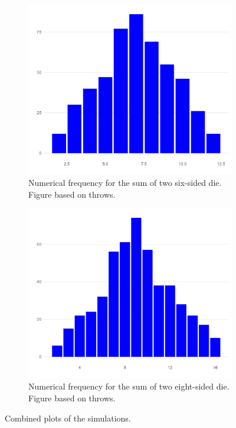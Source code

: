 \documentclass[12pt]{article}
\theoremstyle{definition}
\begin{document}
\begin{figure}[tbh!]
\begin{subfigure}{.5\textwidth}
  \centering
  \includegraphics[width=.8\linewidth]{plot/baseline/hist.png}  
  \caption{Numerical frequency for the sum of two six-sided die. Figure based on throws.}
  \label{fig:sub-first}
\end{subfigure}
\begin{subfigure}{.5\textwidth}
  \centering
  \includegraphics[width=.8\linewidth]{plot/500_8/hist.png}  
  \caption{Numerical frequency for the sum of two eight-sided die. Figure based on throws.}
  \label{fig:sub-second}
\end{subfigure}
\caption{Combined plots of the simulations.}
\label{fig:fig}
\end{figure}
\end{document}
